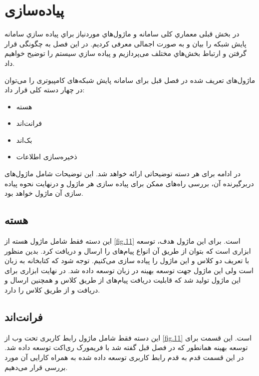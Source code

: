 \chapter{پیاده‌سازی}

در بخش قبلی معماري کلی سامانه و ماژول‌هاي موردنیاز براي پیاده سازي سامانه پایش شبکه را بیان و به صورت اجمالی معرفی کردیم. در این فصل به چگونگی قرار گرفتن و ارتباط بخش‌هاي مختلف می‌پردازیم و پیاده سازي سیستم را توضیح خواهیم داد.


ماژول‌های تعریف شده در فصل قبل برای سامانه پایش شبکه‌های کامپیوتری را می‌توان در چهار دسته کلی قرار داد: 

\begin{itemize}
    \item هسته 
    \item فرانت‌اند 
    \item بک‌اند
    \item ذخیره‌سازی اطلاعات


\end{itemize}

در ادامه برای هر دسته توضیحاتی ارائه خواهد شد. این توضیحات شامل ماژول‌های دربرگیرنده آن، بررسی راه‌های ممکن برای پیاده سازی هر ماژول و درنهایت نحوه پیاده سازی آن ماژول خواهد بود. 


\section{هسته }

این دسته فقط شامل ماژول هسته  از \cref{fig.11} است. برای این ماژول هدف، توسعه ابزاری است که بتوان از طریق آن انواع پیام‌های  را ارسال و دریافت کرد. بدین منظور با تعریف دو کلاس  و  این ماژول را پیاده سازی می‌کنیم. توجه شود که کتابخانه  به زبان  است ولی این ماژول جهت توسعه بهینه در زبان  توسعه داده شد. در نهایت ابزاری برای این ماژول تولید شد که قابلیت دریافت پیام‌های  از طریق کلاس  و همچنین  ارسال و دریافت  و  از طریق کلاس  را دارد.

\newpage

\section{فرانت‌اند}

این دسته فقط شامل ماژول رابط کاربری تحت وب از \cref{fig.11} است. این قسمت برای توسعه بهینه همانطور که در فصل قبل گفته شد با فریمورک ری‌اکت توسعه داده شد. در این قسمت قدم به قدم رابط کاربری توسعه داده شده به همراه کارایی آن مورد بررسی قرار می‌دهیم.


